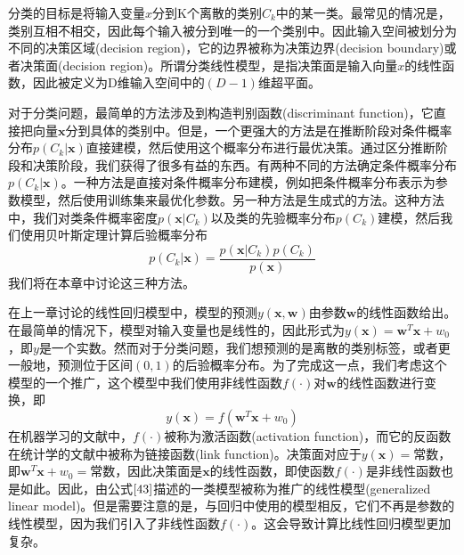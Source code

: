 分类的目标是将输入变量$x$分到K个离散的类别$C_k$中的某一类。最常见的情况是，类别互相不相交，因此每个输入被分到唯一的一个类别中。因此输入空间被划分为不同的决策区域(decision region)，它的边界被称为决策边界(decision boundary)或者决策面(decision region)。所谓分类线性模型，是指决策面是输入向量$x$的线性函数，因此被定义为D维输入空间中的$(D-1)$维超平面。

对于分类问题，最简单的方法涉及到构造判别函数(discriminant function)，它直接把向量$\boldsymbol{x}$分到具体的类别中。但是，一个更强大的方法是在推断阶段对条件概率分布$p(C_k|\boldsymbol{x})$直接建模，然后使用这个概率分布进行最优决策。通过区分推断阶段和决策阶段，我们获得了很多有益的东西。有两种不同的方法确定条件概率分布$p(C_k|\boldsymbol{x})$。一种方法是直接对条件概率分布建模，例如把条件概率分布表示为参数模型，然后使用训练集来最优化参数。另一种方法是生成式的方法。这种方法中，我们对类条件概率密度$p(\boldsymbol{x}|C_k)$以及类的先验概率分布$p(C_k)$建模，然后我们使用贝叶斯定理计算后验概率分布
\begin{equation}
	p(C_k|\boldsymbol{x})=\frac{p(\boldsymbol{x}|C_k)p(C_k)}{p(\boldsymbol{x})}
\end{equation}
我们将在本章中讨论这三种方法。

在上一章讨论的线性回归模型中，模型的预测$y(\boldsymbol{x},\boldsymbol{w})$由参数$\boldsymbol{w}$的线性函数给出。在最简单的情况下，模型对输入变量也是线性的，因此形式为$y(\boldsymbol{x})=\boldsymbol{w}^T\boldsymbol{x}+w_0$，即$y$是一个实数。然而对于分类问题，我们想预测的是离散的类别标签，或者更一般地，预测位于区间$(0,1)$的后验概率分布。为了完成这一点，我们考虑这个模型的一个推广，这个模型中我们使用非线性函数$f(\cdot)$对$\boldsymbol{w}$的线性函数进行变换，即
\begin{equation}
	\label{43}
	y(\boldsymbol{x})=f(\boldsymbol{w}^T\boldsymbol{x}+w_0)
\end{equation}
在机器学习的文献中，$f(\cdot)$被称为激活函数(activation function)，而它的反函数在统计学的文献中被称为链接函数(link function)。决策面对应于$y(\boldsymbol{x})=$常数，即$\boldsymbol{w}^T\boldsymbol{x}+w_0=$常数，因此决策面是$\boldsymbol{x}$的线性函数，即使函数$f(\cdot)$是非线性函数也是如此。因此，由公式$\ref{43}$描述的一类模型被称为推广的线性模型(generalized linear model)。但是需要注意的是，与回归中使用的模型相反，它们不再是参数的线性模型，因为我们引入了非线性函数$f(\cdot)$。这会导致计算比线性回归模型更加复杂。